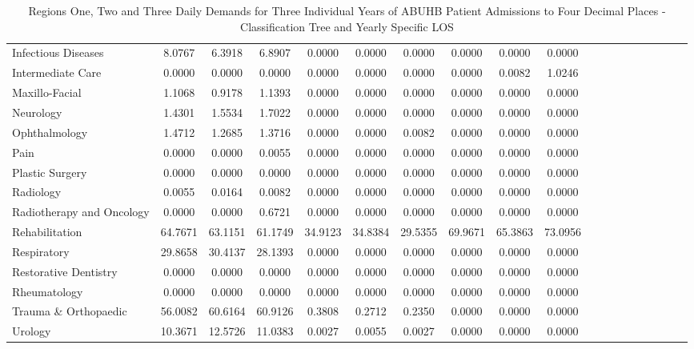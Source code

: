 \documentclass[thesis.tex]{subfiles}
\begin{document}
\begin{landscape}
\begin{table}[h!]
{\begin{tabular}{lcccccccccccccccccc}
Infectious Diseases&	8.0767&	6.3918&	6.8907&	0.0000&	0.0000&	0.0000&	0.0000&	0.0000&	0.0000\\
Intermediate Care&	0.0000&	0.0000&	0.0000&	0.0000&	0.0000&	0.0000&	0.0000&	0.0082&	1.0246\\
Maxillo-Facial&	1.1068&	0.9178&	1.1393&	0.0000&	0.0000&	0.0000&	0.0000&	0.0000&	0.0000\\
Neurology&	1.4301&	1.5534&	1.7022&	0.0000&	0.0000&	0.0000&	0.0000&	0.0000&	0.0000\\
Ophthalmology&	1.4712&	1.2685&	1.3716&	0.0000&	0.0000&	0.0082&	0.0000&	0.0000&	0.0000\\
Pain&	0.0000&	0.0000&	0.0055&	0.0000&	0.0000&	0.0000&	0.0000&	0.0000&	0.0000\\
Plastic Surgery&	0.0000&	0.0000&	0.0000&	0.0000&	0.0000&	0.0000&	0.0000&	0.0000&	0.0000\\
Radiology&	0.0055&	0.0164&	0.0082&	0.0000&	0.0000&	0.0000&	0.0000&	0.0000&	0.0000\\
Radiotherapy and Oncology&	0.0000&	0.0000&	0.6721&	0.0000&	0.0000&	0.0000&	0.0000&	0.0000&	0.0000\\
Rehabilitation&	64.7671&	63.1151&	61.1749&	34.9123&	34.8384&	29.5355&	69.9671&	65.3863&	73.0956\\
Respiratory&	29.8658&	30.4137&	28.1393&	0.0000&	0.0000&	0.0000&	0.0000&	0.0000&	0.0000\\
Restorative Dentistry&	0.0000&	0.0000&	0.0000&	0.0000&	0.0000&	0.0000&	0.0000&	0.0000&	0.0000\\
Rheumatology&	0.0000&	0.0000&	0.0000&	0.0000&	0.0000&	0.0000&	0.0000&	0.0000&	0.0000\\
Trauma \& Orthopaedic&	56.0082&	60.6164&	60.9126&	0.3808&	0.2712&	0.2350&	0.0000&	0.0000&	0.0000\\
Urology&	10.3671&	12.5726&	11.0383&	0.0027&	0.0055&	0.0027&	0.0000&	0.0000&	0.0000\\

\bottomrule
\end{tabular}  } 
\caption{Regions One, Two and Three Daily Demands for Three Individual Years of ABUHB Patient Admissions to Four Decimal Places - Classification Tree and Yearly Specific LOS}
    \label{apptab:LinkedDemands10a}
\end{table}  



\end{landscape}
\end{document}
